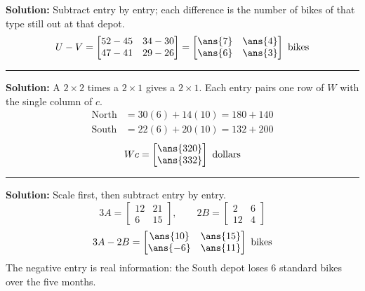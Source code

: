 \documentclass[12pt]{article}
\begin{document}
\textbf{Solution:} Subtract entry by entry; each difference is the number of bikes of that
type still out at that depot.
\[ U - V = \begin{bmatrix} 52 - 45 & 34 - 30 \\ 47 - 41 & 29 - 26 \end{bmatrix}
        = \begin{bmatrix} \ans{7} & \ans{4} \\ \ans{6} & \ans{3} \end{bmatrix} \text{ bikes} \]

\vspace{0.2cm}\noindent\rule{\linewidth}{0.2pt}


\textbf{Solution:} A $2 \times 2$ times a $2 \times 1$ gives a $2 \times 1$. Each entry pairs
one row of $W$ with the single column of $c$.
\begin{align*}
  \text{North} &= 30(6) + 14(10) = 180 + 140 \\
  \text{South} &= 22(6) + 20(10) = 132 + 200
\end{align*}
\[ Wc = \begin{bmatrix} \ans{320} \\ \ans{332} \end{bmatrix} \text{ dollars} \]

\vspace{0.2cm}\noindent\rule{\linewidth}{0.2pt}


\textbf{Solution:} Scale first, then subtract entry by entry.
\[ 3A = \begin{bmatrix} 12 & 21 \\ 6 & 15 \end{bmatrix}, \qquad
   2B = \begin{bmatrix} 2 & 6 \\ 12 & 4 \end{bmatrix} \]
\[ 3A - 2B = \begin{bmatrix} \ans{10} & \ans{15} \\ \ans{-6} & \ans{11} \end{bmatrix} \text{ bikes} \]
The negative entry is real information: the South depot loses $6$ standard bikes over the
five months.
\end{document}
